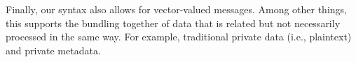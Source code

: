 Finally, our syntax also allows for vector-valued messages.  Among other things, this supports the bundling together of data that is related but not necessarily processed in the same way.  For example, traditional private data (i.e., plaintext) and private metadata.  

 






